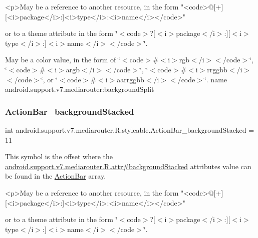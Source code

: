 \begin{DoxyVerb}      <p>May be a reference to another resource, in the form "<code>@[+][<i>package</i>:]<i>type</i>:<i>name</i></code>"
\end{DoxyVerb}
 or to a theme attribute in the form \char`\"{}$<$code$>$?\mbox{[}$<$i$>$package$<$/i$>$\+:\mbox{]}\mbox{[}$<$i$>$type$<$/i$>$\+:\mbox{]}$<$i$>$name$<$/i$>$$<$/code$>$\char`\"{}. 

May be a color value, in the form of \char`\"{}$<$code$>$\#$<$i$>$rgb$<$/i$>$$<$/code$>$\char`\"{}, \char`\"{}$<$code$>$\#$<$i$>$argb$<$/i$>$$<$/code$>$\char`\"{}, \char`\"{}$<$code$>$\#$<$i$>$rrggbb$<$/i$>$$<$/code$>$\char`\"{}, or \char`\"{}$<$code$>$\#$<$i$>$aarrggbb$<$/i$>$$<$/code$>$\char`\"{}.  name android.\+support.\+v7.\+mediarouter\+:background\+Split \mbox{\label{classandroid_1_1support_1_1v7_1_1mediarouter_1_1R_1_1styleable_ac5c86fa90bff4275662ebc51c94cbda2}} 
\subsubsection{\texorpdfstring{Action\+Bar\+\_\+background\+Stacked}{ActionBar\_backgroundStacked}}
{\footnotesize\ttfamily int android.\+support.\+v7.\+mediarouter.\+R.\+styleable.\+Action\+Bar\+\_\+background\+Stacked = 11\hspace{0.3cm}{\ttfamily [static]}}

This symbol is the offset where the \hyperlink{classandroid_1_1support_1_1v7_1_1mediarouter_1_1R_1_1attr_a0878fdadbebb45af51c29b96466b0ed5}{android.\+support.\+v7.\+mediarouter.\+R.\+attr\#background\+Stacked} attribute\textquotesingle{}s value can be found in the \hyperlink{classandroid_1_1support_1_1v7_1_1mediarouter_1_1R_1_1styleable_adc4d3c0d096085367f12d025007aa53f}{Action\+Bar} array.

\begin{DoxyVerb}      <p>May be a reference to another resource, in the form "<code>@[+][<i>package</i>:]<i>type</i>:<i>name</i></code>"
\end{DoxyVerb}
 or to a theme attribute in the form \char`\"{}$<$code$>$?\mbox{[}$<$i$>$package$<$/i$>$\+:\mbox{]}\mbox{[}$<$i$>$type$<$/i$>$\+:\mbox{]}$<$i$>$name$<$/i$>$$<$/code$>$\char`\"{}. 

